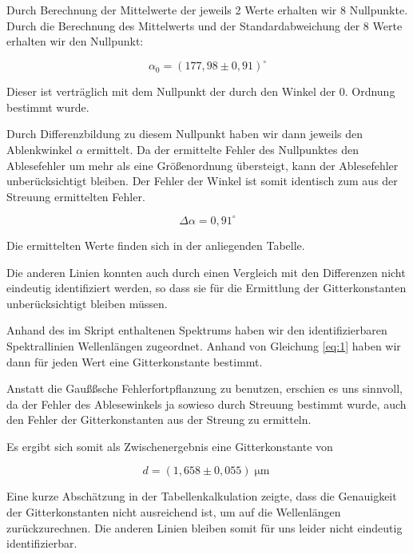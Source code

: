 \documentclass[a4paper,german,12pt,smallheadings]{scrartcl}
\begin{document}
Durch Berechnung der Mittelwerte der jeweils 2 Werte erhalten wir 8 Nullpunkte.
Durch die Berechnung des Mittelwerts und der Standardabweichung der 8 Werte
erhalten wir den Nullpunkt:

\begin{equation*}
  \alpha_0 = (177{,}98\pm0{,}91)^\circ
\end{equation*}

Dieser ist verträglich mit dem Nullpunkt der durch den Winkel der 0. Ordnung
bestimmt wurde.

Durch Differenzbildung zu diesem Nullpunkt haben wir dann jeweils den
Ablenkwinkel $\alpha$ ermittelt. Da der ermittelte Fehler des Nullpunktes den
Ablesefehler um mehr als eine Größenordnung übersteigt, kann der Ablesefehler
unberücksichtigt bleiben. Der Fehler der Winkel ist somit identisch zum aus der
Streuung ermittelten Fehler.

\begin{equation*}
  \Delta \alpha = 0{,}91^\circ
\end{equation*}

Die ermittelten Werte finden sich in der anliegenden Tabelle.

Die anderen Linien konnten auch durch einen Vergleich mit den Differenzen nicht
eindeutig identifiziert werden, so dass sie für die Ermittlung der
Gitterkonstanten unberücksichtigt bleiben müssen.

Anhand des im Skript enthaltenen Spektrums haben wir den identifizierbaren
Spektrallinien Wellenlängen zugeordnet. Anhand von Gleichung \ref{eq:1} haben
wir dann für jeden Wert eine Gitterkonstante bestimmt.

Anstatt die Gaußßsche Fehlerfortpflanzung zu benutzen, erschien es uns
sinnvoll, da der Fehler des Ablesewinkels ja sowieso durch Streuung bestimmt
wurde, auch den Fehler der Gitterkonstanten aus der Streung zu ermitteln.

Es ergibt sich somit als Zwischenergebnis eine Gitterkonstante von

\begin{equation*}
  d = (1{,}658\pm0{,}055) \operatorname{\mu m}
\end{equation*}

Eine kurze Abschätzung in der Tabellenkalkulation zeigte, dass die Genauigkeit
der Gitterkonstanten nicht ausreichend ist, um auf die Wellenlängen
zurückzurechnen. Die anderen Linien bleiben somit für uns leider nicht
eindeutig identifizierbar.
\end{document}
